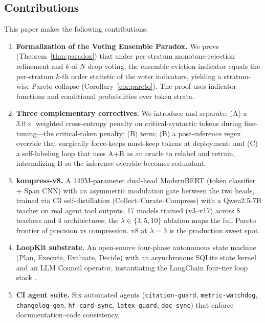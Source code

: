 \subsection{Contributions}

This paper makes the following contributions:

\begin{enumerate}
  \item \textbf{Formalization of the Voting Ensemble Paradox.} We prove
        (Theorem~\ref{thm:paradox}) that under per-stratum
        monotone-rejection refinement and $k$-of-$N$ drop voting, the
        ensemble eviction indicator equals the per-stratum $k$-th order
        statistic of the voter indicators, yielding a stratum-wise Pareto
        collapse (Corollary~\ref{cor:pareto}). The proof uses indicator
        functions and conditional probabilities over token strata.
  \item \textbf{Three complementary correctives.} We introduce and
        separate: (A) a $3.0\times$ weighted cross-entropy penalty on
        critical-syntactic tokens during fine-tuning---the critical-token penalty; (B)
        term; (B) a post-inference regex override that surgically
        force-keeps must-keep tokens at deployment; and (C) a self-labeling
        loop that uses A+B as an oracle to relabel and retrain, internalizing
        B so the inference override becomes redundant.
  \item \textbf{kompress-v8.} A 149M-parameter dual-head ModernBERT
        (token classifier + Span CNN) with an asymmetric modulation gate
        between the two heads, trained via C3 self-distillation
        (Collect--Curate--Compress) with a Qwen2.5-7B teacher on real agent
        tool outputs. 17 models trained (v3--v17) across 8 teachers and 4
        architectures; the $\lambda\in\{3,5,10\}$ ablation maps the full
        Pareto frontier of precision vs compression. v8 at $\lambda{=}3$ is
        the production sweet spot.
  \item \textbf{LoopKit substrate.} An open-source four-phase autonomous
        state machine (Plan, Execute, Evaluate, Decide) with an asynchronous
        SQLite state kernel and an LLM Council operator, instantiating the
        LangChain four-tier loop stack \citep{lodri2026loopkit}.
  \item \textbf{CI agent suite.} Six automated agents
        (\texttt{citation-guard}, \texttt{metric-watchdog},
        \texttt{changelog-gen}, \texttt{hf-card-sync}, \texttt{latex-guard},
        \texttt{doc-sync}) that enforce documentation--code consistency,

\end{enumerate}
